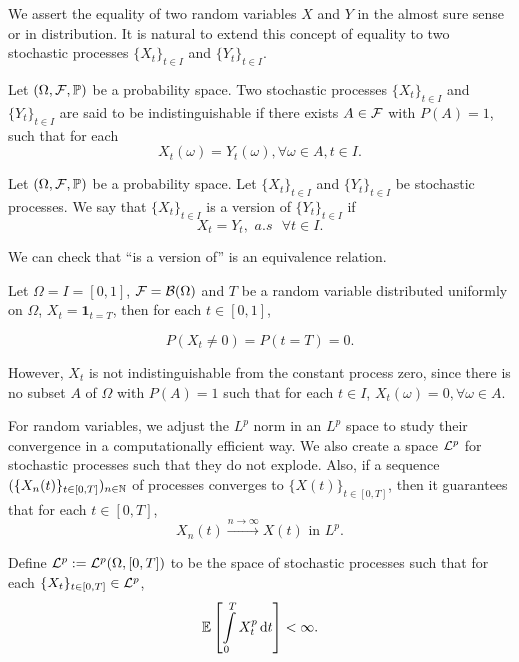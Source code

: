 We assert the equality of two random variables $X$ and $Y$ in the almost sure sense or in distribution. It is natural to extend this concept of equality to two stochastic processes $\{X_t\}_{t\in I}$ and $\{Y_t\}_{t\in I}$.

\begin{definition}
 Let $(\Omega, \mathcal{F}, \mathbb{P})$ be a probability space. Two stochastic processes $\{X_t\}_{t\in I}$ and $\{Y_t\}_{t\in I}$ are said to be indistinguishable  if there exists $A\in\mathcal{F}$ with $P(A)=1$, such that for each
 $$X_t(\omega)= Y_t(\omega), \forall \omega\in A, t\in I.$$
\end{definition}

\begin{definition}
 Let $(\Omega, \mathcal{F}, \mathbb{P})$ be a probability space. Let $\{X_t\}_{t\in I}$ and $\{Y_t\}_{t\in I}$ be stochastic processes. We say that $\{X_t\}_{t\in I}$ is a version of $\{Y_t\}_{t\in I}$ if
 $$X_t=Y_t,\,\, a.s \,\,\,\,\forall t\in I.$$
\end{definition}

\begin{remark}
 We can check that ``is a version of'' is an equivalence relation.
\end{remark}

\begin{example}
 \label{example:dis}
 Let $\Omega=I=[0,1]$, $\mathcal{F}=\mathcal{B}(\Omega)$ and $T$ be a random variable distributed uniformly on $\Omega$, $X_t=\mathbf{1}_{t=T}$, then for each $t\in[0,1]$,

 $$P(X_t\ne 0) = P(t=T) = 0.$$

 However, $X_t$ is not indistinguishable from the constant process zero, since there is no subset $A$ of $\Omega$ with $P(A)=1$ such that for each $t\in I$, $X_t(\omega)= 0, \forall \omega\in A.$
\end{example}

For random variables, we adjust the $L^p$ norm in an $L^p$ space to study their convergence in a computationally efficient way. We also create a space $\mathcal{L}^p$ for stochastic processes such that they do not explode. Also, if a sequence $(\{X_n(t)\}_{t\in[0,T]})_{n\in\mathbb{N}}$ of processes converges to $\{X(t)\}_{t\in[0,T]}$, then it guarantees that for each $t\in[0,T]$,
$$X_n(t) \xrightarrow{n\to\infty} X(t) \text{ in } L^p.$$

\begin{definition}
 Define $\mathcal{L}^p:=\mathcal{L}^p(\Omega, [0,T])$ to be the space of stochastic processes such that for each $\{X_t\}_{t\in [0,T]}\in \mathcal{L}^p$,
 $$\mathbb{E}\left[\int\limits_0^T X^p_t \,\mathrm{d} t\right] < \infty.$$
\end{definition}


